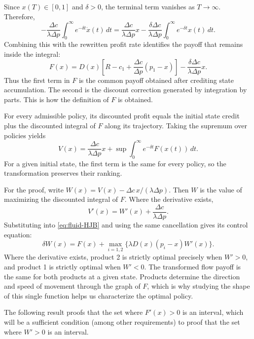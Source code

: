 \documentclass[11pt]{article}
\begin{document}
Since $x(T)\in[0,1]$ and $\delta>0$, the terminal term vanishes as
$T\to\infty$. Therefore,
\begin{equation*}
-\frac{\Delta c}{\lambda\Delta p}
\int_0^\infty e^{-\delta t}\dot x(t)\,dt
=\frac{\Delta c}{\lambda\Delta p}x
-\frac{\delta\Delta c}{\lambda\Delta p}
\int_0^\infty e^{-\delta t}x(t)\,dt.
\end{equation*}
Combining this with the rewritten profit rate identifies the payoff
that remains inside the integral:
\begin{equation}\label{eq:F}
F(x)=D(x)\left[R-c_1+\frac{\Delta c}{\Delta p}(p_1-x)\right]
       -\frac{\delta\Delta c}{\lambda\Delta p}x.
\end{equation}
Thus the first term in $F$ is the common payoff obtained after crediting
state accumulation. The second is the discount correction generated by
integration by parts. This is how the definition of $F$ is obtained.

For every admissible policy, its discounted profit equals the initial
state credit plus the discounted integral of $F$ along its trajectory.
Taking the supremum over policies yields
\begin{equation}\label{eq:transform}
V(x)=\frac{\Delta c}{\lambda\Delta p}x+
       \sup\int_0^\infty e^{-\delta t}F(x(t))\,dt.
\end{equation}
For a given initial state, the first term is the same for every policy,
so the transformation preserves their ranking.

For the proof, write
$W(x)=V(x)-\Delta c\,x/(\lambda\Delta p)$.
Then $W$ is the value of maximizing the discounted integral of $F$.
Where the derivative exists,
\begin{equation*}
V'(x)=W'(x)+\frac{\Delta c}{\lambda\Delta p}.
\end{equation*}
Substituting into \eqref{eq:fluid-HJB} and using the same cancellation
gives its control equation:
\begin{equation}\label{eq:W-HJB}
\delta W(x)=F(x)+\max_{i=1,2}
             \{\lambda D(x)(p_i-x)W'(x)\}.
\end{equation}
Where the derivative exists, product 2 is strictly optimal precisely when $W'>0$, and product 1 is strictly optimal when $W'<0$. The transformed flow payoff is the same for both products at a given state. Products determine the direction and speed of movement through the graph of $F$, which is why studying the shape of this single function helps us characterize the optimal policy.

The following result proofs that the set where $F'(x)>0$ is an interval, which will be a sufficient condition (among other requirements) to proof that the set where $W'>0$ is an interval.
\end{document}
